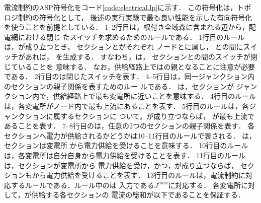 電流制約のASP符号化をコード\ref{code:electrical.lp}に示す．
この符号化は，トポロジ制約の符号化として，
後述の実行実験で最も良い性能を示した有向符号化を使うことを前提としている．
% 
1--2行目は，根付き全域森に含まれる辺から，配電網における閉じ
たスイッチを求めるためのルールである．
1行目のルールは，が成り立つとき，
セクションとがそれぞれ
ノードとに属し，
との間にスイッチがあれば，
を生成する．
すなわち，は，
セクションとの間のスイッチが閉じていることを
意味する．
なお，供給経路上ではの親となることに注意が必要である．
2行目のは閉じたスイッチを表す．
%
4--5行目は，同一ジャンクション内のセクションの親子関係を表すためのルー
ルである．
は，セクションが
ジャンクション内で，供給経路上で最も変電所に近いことを意味する．
4行目のルールは，各変電所がノード内で最も上流にあることを表す．
5行目のルールは，各ジャンクションに属するセクションに
ついて，が成り立つならば，
が最も上流であることを表す．
%
7--8行目のは，任意の2つのセクションの親子関係を表す．
%
各セクションへ電力が供給されるかどうかは10--11行目のルールで表される．
は，セクションは変電所
から電力供給を受けることを意味する．
10行目のルールは，各変電所は自分自身から電力供給を受けることを表す．
11行目のルールは，セクションが変電所から
電力供給を受け，かつ，が成り立つならば，
セクションもから電力供給を受けることを表す．
%
13行目のルールは，電流制約に対応するルールである．ルール中のは
入力である$J^{max}$に対応する．
各変電所に対して，が供給する各セクションの
電流の総和が以下であることを保証する．

